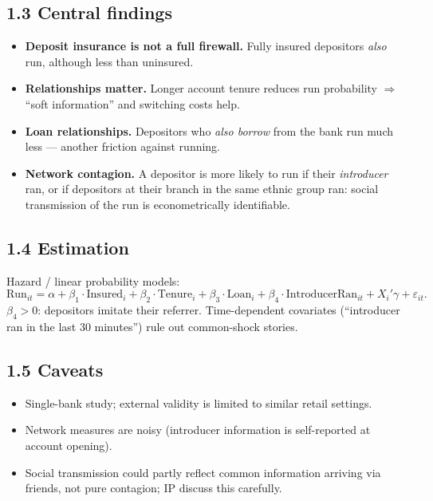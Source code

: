 \documentclass[11pt]{article}
\begin{document}
\subsection*{1.3 Central findings}
\begin{itemize}
\item \textbf{Deposit insurance is not a full firewall.} Fully insured depositors \emph{also} run, although less than uninsured.
\item \textbf{Relationships matter.} Longer account tenure reduces run probability $\Rightarrow$ ``soft information'' and switching costs help.
\item \textbf{Loan relationships.} Depositors who \emph{also borrow} from the bank run much less --- another friction against running.
\item \textbf{Network contagion.} A depositor is more likely to run if their \emph{introducer} ran, or if depositors at their branch in the same ethnic group ran: social transmission of the run is econometrically identifiable.
\end{itemize}

\subsection*{1.4 Estimation}
Hazard / linear probability models:
\[
\text{Run}_{it}=\alpha + \beta_1\cdot\text{Insured}_i+\beta_2\cdot\text{Tenure}_i+\beta_3\cdot\text{Loan}_i+\beta_4\cdot\text{IntroducerRan}_{it}+X_i'\gamma+\varepsilon_{it}.
\]
$\beta_4>0$: depositors imitate their referrer. Time-dependent covariates (``introducer ran in the last 30 minutes'') rule out common-shock stories.

\subsection*{1.5 Caveats}
\begin{alertbox}
\begin{itemize}
\item Single-bank study; external validity is limited to similar retail settings.
\item Network measures are noisy (introducer information is self-reported at account opening).
\item Social transmission could partly reflect common information arriving via friends, not pure contagion; IP discuss this carefully.
\end{itemize}
\end{alertbox}
\end{document}
